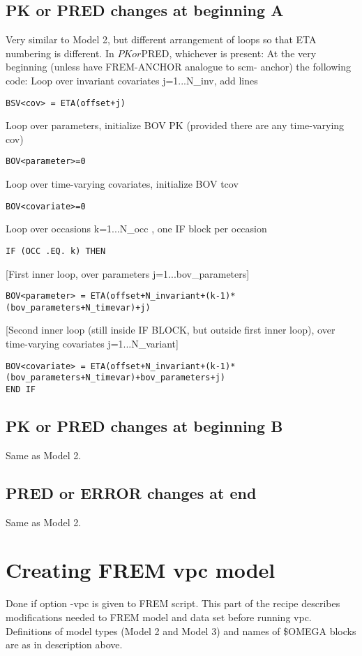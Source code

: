 \subsection{PK or PRED changes at beginning A}
Very similar to Model 2, but different arrangement of loops so that ETA numbering is different.
In $PK or $PRED, whichever is present:
At the very beginning (unless have FREM-ANCHOR analogue to scm- anchor) the following code: 
Loop over invariant covariates j=1...N\_inv, add lines
\begin{verbatim}
BSV<cov> = ETA(offset+j)
\end{verbatim}
Loop over parameters, initialize BOV PK (provided there are any time-varying cov)
\begin{verbatim}
BOV<parameter>=0
\end{verbatim}
Loop over time-varying covariates, initialize BOV tcov
\begin{verbatim}
BOV<covariate>=0
\end{verbatim}
Loop over occasions k=1...N\_occ , one IF block per occasion
\begin{verbatim}
IF (OCC .EQ. k) THEN
\end{verbatim}
[First inner loop, over parameters j=1...bov\_parameters]
\begin{verbatim}
BOV<parameter> = ETA(offset+N_invariant+(k-1)*(bov_parameters+N_timevar)+j)
\end{verbatim}
[Second inner loop (still inside IF BLOCK, but outside first inner loop), over time-varying covariates j=1...N\_variant]
\begin{verbatim}
BOV<covariate> = ETA(offset+N_invariant+(k-1)*(bov_parameters+N_timevar)+bov_parameters+j)
END IF
\end{verbatim}

\subsection{PK or PRED changes at beginning B}
Same as Model 2.

\subsection{PRED or ERROR changes at end}
Same as Model 2.

\section{Creating FREM vpc model}
Done if option -vpc is given to FREM script. This part of the recipe describes modifications needed to FREM model and data set before running vpc. Definitions of model types (Model 2 and Model 3) and names of \$OMEGA blocks are as in description above. 

